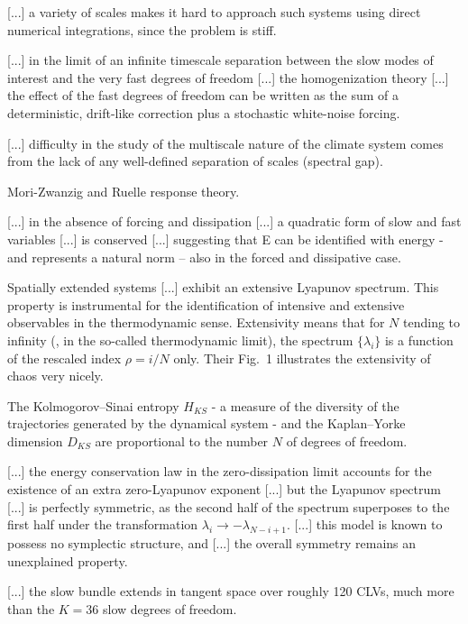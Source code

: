 \begin{description}
{[...] a variety of scales makes it hard to approach such systems using
direct numerical integrations, since the problem is stiff.

[...] in the limit of an infinite timescale separation between the slow
modes of interest and the very fast degrees of freedom [...]  the
homogenization theory [...] the effect of the fast degrees of freedom can
be written as the sum of a deterministic, drift-like correction plus a
stochastic white-noise forcing.

[...] difficulty in the study of the multiscale nature of the climate
system comes from the lack of any well-defined separation of scales
(spectral gap).

Mori-Zwanzig and Ruelle response theory.

[...] in the absence of forcing and dissipation [...] a quadratic form of
slow and fast variables [...] is conserved [...] suggesting
that E can be identified with energy - and represents a natural norm –
also in the forced and dissipative case.

Spatially extended systems [...] exhibit an extensive Lyapunov
spectrum. This property is
instrumental for the identification of intensive and extensive
observables in the thermodynamic sense. Extensivity means that for $N$
tending to infinity (\ie, in the so-called thermodynamic limit), the
spectrum $\{\lambda_i\}$ is a function of the rescaled index $\rho=i/N$
only. Their Fig.~1 illustrates the extensivity of chaos very nicely.

The Kolmogorov–Sinai entropy $H_{KS}$ - a measure of the diversity of the
trajectories generated by the dynamical system - and the Kaplan–Yorke
dimension $D_{KS}$ are proportional to the number $N$ of degrees of
freedom.

[...] the energy conservation law in the zero-dissipation limit accounts
for the existence of an extra zero-Lyapunov exponent [...] but the
Lyapunov spectrum [...] is perfectly symmetric, as the second half of the
spectrum superposes to the first half under the transformation
$\lambda_i\to-\lambda_{N-i+1}$. [...] this model is known to possess no
symplectic structure, and [...] the overall symmetry remains an
unexplained property.

[...] the slow bundle extends in tangent space over roughly 120 CLVs,
much more than the $K=36$ slow degrees of freedom.

}
\end{description}
